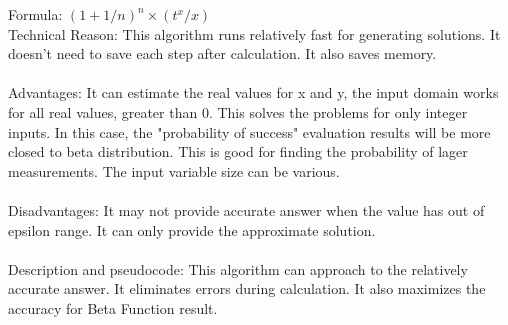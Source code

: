 \documentclass{article} \usepackage{mathtools} \usepackage{algorithm}
\begin{document}
\State Formula: $(1+1/n)^n \times( t^x / x) $ \\
Technical Reason: This algorithm runs relatively fast for generating solutions. It doesn’t need to save each step after calculation. It also saves memory. \\ \\
 Advantages: It can estimate the real values for x and y, the input domain works for all real values, greater than 0. This solves the problems for only integer inputs. In this case, the "probability of success" evaluation results will be more closed to beta distribution. This is good for finding the probability of lager measurements. The input variable size can be various. \\ \\
 Disadvantages: It may not provide accurate answer when the value has out of epsilon range. It can only provide the approximate solution. \\ \\
Description and pseudocode: This algorithm can approach to the relatively accurate answer. It eliminates errors during calculation. It also maximizes the accuracy for Beta Function result.
\end{document}
